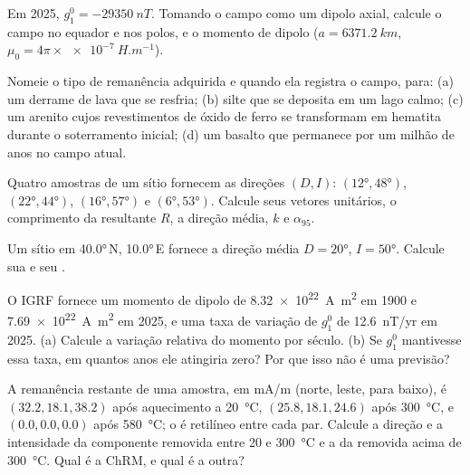 \begin{exercise}[$\star$]\label{exo:b3:palaeomagnetism:3}
Em 2025, $g_1^0 = \qty{-29350}{nT}$. Tomando o campo como um dipolo axial,
calcule o campo no equador e nos polos, e o momento de dipolo
($a = \qty{6371.2}{km}$, $\mu_0 = 4\pi\times\qty{e-7}{H.m^{-1}}$).
\end{exercise}

\begin{exercise}[$\star$]\label{exo:b3:palaeomagnetism:4}
Nomeie o tipo de remanência adquirida e quando ela registra o campo, para: (a) um
derrame de lava que se resfria; (b) silte que se deposita em um lago calmo; (c) um
arenito cujos revestimentos de óxido de ferro se transformam em hematita durante o
soterramento inicial; (d) um basalto que permanece por um milhão de anos no campo atual.
\end{exercise}

\begin{exercise}[$\star\star$]\label{exo:b3:palaeomagnetism:5}
Quatro amostras de um sítio fornecem as direções $(D, I)$: $(\ang{12}, \ang{48})$,
$(\ang{22}, \ang{44})$, $(\ang{16}, \ang{57})$ e $(\ang{6}, \ang{53})$.
Calcule seus vetores unitários, o comprimento da resultante $R$, a direção média, $k$
e $\alpha_{95}$.
\end{exercise}

\begin{exercise}[$\star\star$]\label{exo:b3:palaeomagnetism:6}
Um sítio em \ang{40.0}\,N, \ang{10.0}\,E fornece a direção média $D = \ang{20}$,
$I = \ang{50}$. Calcule sua  e seu .
\end{exercise}

\begin{exercise}[$\star\star$]\label{exo:b3:palaeomagnetism:7}
O IGRF fornece um momento de dipolo de \qty{8.32e22}{A.m^2} em 1900 e
\qty{7.69e22}{A.m^2} em 2025, e uma taxa de variação de $g_1^0$ de
\qty{+12.6}{nT/yr} em 2025. (a) Calcule a variação relativa do momento por
século. (b) Se $g_1^0$ mantivesse essa taxa, em quantos anos ele atingiria zero?
Por que isso não é uma previsão?
\end{exercise}

\begin{exercise}[$\star\star$]\label{exo:b3:palaeomagnetism:8}
A remanência restante de uma amostra, em \unit{mA/m} (norte, leste, para baixo), é
$(32.2, 18.1, 38.2)$ após aquecimento a \qty{20}{\celsius}, $(25.8, 18.1, 24.6)$
após \qty{300}{\celsius}, e $(0.0, 0.0, 0.0)$ após \qty{580}{\celsius}; o
 é retilíneo entre cada par. Calcule a direção e a
intensidade da componente removida entre 20 e \qty{300}{\celsius} e a da
removida acima de \qty{300}{\celsius}. Qual é a ChRM, e qual é a
outra?
\end{exercise}

